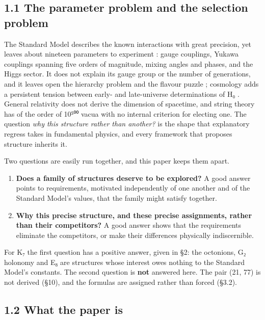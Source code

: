 \documentclass[11pt,a4paper]{article}
\begin{document}
\subsection{1.1 The parameter problem and the selection problem}\label{the-parameter-problem-and-the-selection-problem}

The Standard Model describes the known interactions with great precision, yet leaves about nineteen parameters to experiment \cite{1}: gauge couplings, Yukawa couplings spanning five orders of magnitude, mixing angles and phases, and the Higgs sector. It does not explain its gauge group or the number of generations, and it leaves open the hierarchy problem \cite{2} and the flavour puzzle \cite{5}; cosmology adds a persistent tension between early- and late-universe determinations of H₀ \cite{3,4}. General relativity does not derive the dimension of spacetime, and string theory has of the order of 10⁵⁰⁰ vacua with no internal criterion for electing one. The question \emph{why this structure rather than another?} is the shape that explanatory regress takes in fundamental physics, and every framework that proposes structure inherits it.

Two questions are easily run together, and this paper keeps them apart.

\begin{enumerate}
\def\labelenumi{\arabic{enumi}.}
\tightlist
\item
  \textbf{Does a family of structures deserve to be explored?} A good answer points to requirements, motivated independently of one another and of the Standard Model's values, that the family might satisfy together.
\item
  \textbf{Why this precise structure, and these precise assignments, rather than their competitors?} A good answer shows that the requirements eliminate the competitors, or make their differences physically indiscernible.
\end{enumerate}

For K₇ the first question has a positive answer, given in §2: the octonions, G₂ holonomy and E₈ are structures whose interest owes nothing to the Standard Model's constants. The second question is \textbf{not} answered here. The pair (21, 77) is not derived (§10), and the formulas are assigned rather than forced (§3.2).

\subsection{1.2 What the paper is}\label{what-the-paper-is}
\end{document}
